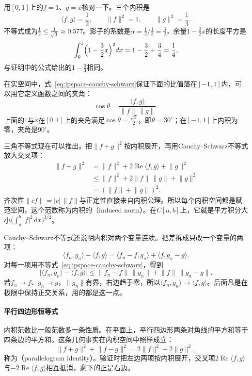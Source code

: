 用$[0,1]$上的$f=1$、$g=x$核对一下。三个内积是
\[
 \langle f,g\rangle=\frac12,\qquad \lVert f\rVert^2=1,\qquad \lVert g\rVert^2=\frac13 .
\]
不等式成为$\tfrac12\leq\tfrac1{\sqrt3}\approx0.577$。影子的系数是$\alpha=\tfrac12\big/\tfrac13=\tfrac32$，余量$1-\tfrac32x$的长度平方是
\[
 \int_0^1\Bigl(1-\frac32x\Bigr)^2dx=1-\frac32+\frac34=\frac14,
\]
与证明中的公式给出的$1-\tfrac34$相同。

在实空间中，式~\eqref{eq:ipspace-cauchy-schwarz}保证下面的比值落在$[-1,1]$内，可以用它定义函数之间的夹角：
\[
 \cos\theta=\frac{\langle f,g\rangle}{\lVert f\rVert\,\lVert g\rVert}.
\]
上面的$1$与$x$在$[0,1]$上的夹角满足$\cos\theta=\tfrac{\sqrt3}2$，即$\theta=30^\circ$；在$[-1,1]$上内积为零，夹角是$90^\circ$。

三角不等式现在可以推出。把$\lVert f+g\rVert^2$按内积展开，再用Cauchy--Schwarz不等式放大交叉项：
\[
 \begin{aligned}
 \lVert f+g\rVert^2&=\lVert f\rVert^2+2\operatorname{Re}\langle f,g\rangle+\lVert g\rVert^2\\
 &\leq\lVert f\rVert^2+2\lVert f\rVert\,\lVert g\rVert+\lVert g\rVert^2\\
 &=(\lVert f\rVert+\lVert g\rVert)^2 .
 \end{aligned}
\]
齐次性$\lVert cf\rVert=\lvert c\rvert\,\lVert f\rVert$与正定性直接来自内积公理。所以每个内积空间都是赋范空间，这个范数称为内积的（induced norm）。在$C[a,b]$上，它就是平方积分大小$\bigl(\int_a^b\lvert f\rvert^2\,dx\bigr)^{1/2}$。

Cauchy--Schwarz不等式还说明内积对两个变量连续。把差拆成只改一个变量的两项：
\[
 \langle f_n,g_n\rangle-\langle f,g\rangle=\langle f_n-f,g_n\rangle+\langle f,g_n-g\rangle .
\]
对每一项用不等式~\eqref{eq:ipspace-cauchy-schwarz}，得到
\begin{equation}
 \lvert\langle f_n,g_n\rangle-\langle f,g\rangle\rvert\leq\lVert f_n-f\rVert\,\lVert g_n\rVert+\lVert f\rVert\,\lVert g_n-g\rVert .
 \label{eq:ipspace-inner-continuity}
\end{equation}
若$f_n\to f$、$g_n\to g$，$\lVert g_n\rVert$有界，右边趋于零，所以$\langle f_n,g_n\rangle\to\langle f,g\rangle$。后面凡是在极限中保持正交关系，用的都是这一点。

\paragraph{平行四边形恒等式}
内积范数比一般范数多一条性质。在平面上，平行四边形两条对角线的平方和等于四条边的平方和。这条几何事实在内积空间中照样成立：
\begin{equation}
 \lVert f+g\rVert^2+\lVert f-g\rVert^2=2\lVert f\rVert^2+2\lVert g\rVert^2 ,
 \label{eq:ipspace-parallelogram}
\end{equation}
称为（parallelogram identity）。验证时把左边两项按内积展开，交叉项$2\operatorname{Re}\langle f,g\rangle$与$-2\operatorname{Re}\langle f,g\rangle$相互抵消，剩下的正是右边。

